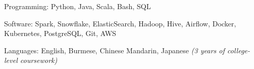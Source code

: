 

\begin{cvskills}

  \cvskill
  {Programming:} %
  {Python, Java, Scala, Bash, SQL}

  \cvskill
  {Software:} %
  {Spark, Snowflake, ElasticSearch, Hadoop, Hive, Airflow, Docker, Kubernetes, PostgreSQL, Git, AWS} %

  \cvskill
  {Languages:} %
  {English, Burmese, Chinese Mandarin, Japanese \bodyfontlight\emph{(3 years of college-level coursework)}} %

\end{cvskills}
